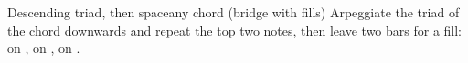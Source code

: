 \begin{patternbox}{Descending triad, then space}{any chord (bridge with fills)}
Arpeggiate the triad of the chord downwards and repeat the top two notes,
then leave two bars for a fill: on  ,
on  , on  .
\patternwhereline
\end{patternbox}
